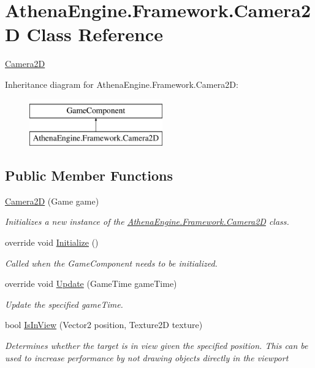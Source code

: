 \hypertarget{class_athena_engine_1_1_framework_1_1_camera2_d}{\section{Athena\-Engine.\-Framework.\-Camera2\-D Class Reference}
\label{class_athena_engine_1_1_framework_1_1_camera2_d}
}


\hyperlink{class_athena_engine_1_1_framework_1_1_camera2_d}{Camera2\-D}  


Inheritance diagram for Athena\-Engine.\-Framework.\-Camera2\-D\-:\begin{figure}[H]
\begin{center}
\leavevmode
\includegraphics[height=2.000000cm]{class_athena_engine_1_1_framework_1_1_camera2_d}
\end{center}
\end{figure}
\subsection*{Public Member Functions}
\begin{DoxyCompactItemize}
\item 
\hyperlink{class_athena_engine_1_1_framework_1_1_camera2_d_a5cabf8628e9a3bf76d22cc4630c8b9a7}{Camera2\-D} (Game game)
\begin{DoxyCompactList}\small\item\em Initializes a new instance of the \hyperlink{class_athena_engine_1_1_framework_1_1_camera2_d}{Athena\-Engine.\-Framework.\-Camera2\-D} class. \end{DoxyCompactList}\item 
override void \hyperlink{class_athena_engine_1_1_framework_1_1_camera2_d_a404974721a2e52d38a8f2a929420efcb}{Initialize} ()
\begin{DoxyCompactList}\small\item\em Called when the Game\-Component needs to be initialized. \end{DoxyCompactList}\item 
override void \hyperlink{class_athena_engine_1_1_framework_1_1_camera2_d_a98b0a1814f87cb1c61cae210c667c94f}{Update} (Game\-Time game\-Time)
\begin{DoxyCompactList}\small\item\em Update the specified game\-Time. \end{DoxyCompactList}\item 
bool \hyperlink{class_athena_engine_1_1_framework_1_1_camera2_d_af59c31839e3b5f77266227a038c1e50c}{Is\-In\-View} (Vector2 position, Texture2\-D texture)
\begin{DoxyCompactList}\small\item\em Determines whether the target is in view given the specified position. This can be used to increase performance by not drawing objects directly in the viewport \end{DoxyCompactList}\end{DoxyCompactItemize}
